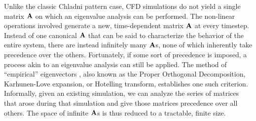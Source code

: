 Unlike the classic Chladni pattern case, CFD simulations do not yield a single matrix $\mathbf{A}$ on which an eigenvalue analysis can be performed. The non-linear operations involved generate a new, time-dependent matrix $\mathbf{A}$ at every timestep. Instead of one canonical $\mathbf{A}$ that can be said to characterize the behavior of the entire system, there are instead infinitely many $\mathbf{A}$s, none of which inherently take precedence over the others. Fortunately, if some sort of precedence is imposed, a process akin to an eigenvalue analysis can still be applied.
The method of ``empirical'' eigenvectors \cite{Ryckelynck2005}, also known as the Proper Orthogonal Decomposition, Karhunen-Love expansion, or Hotelling transform, establishes one such criterion. Informally, given an existing simulation, we can analyze the series of matrices that arose during that simulation and give those matrices precedence over all others. The space of infinite $\mathbf{A}$s is thus reduced to a tractable, finite size.




